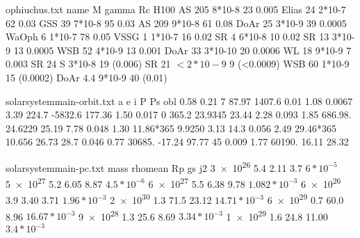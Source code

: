 \begin{filecontents}{ophiuchus.txt}
name            M    gamma      Rc      H100
  AS 205       8*10-8     23    0.005
  Elias 24     2*10-7     62    0.03
  GSS 39       7*10-8     95    0.03
  AS 209       9*10-8     61    0.08
  DoAr 25      3*10-9     39    0.0005
  WaOph 6      1*10-7     78    0.05
  VSSG 1       1*10-7     16    0.02
  SR 4         6*10-8     10    0.02
  SR 13        3*10-9     13    0.0005
  WSB 52       4*10-9     13    0.001
  DoAr 33      3*10-10    20    0.0006
  WL 18        9*10-9     7     0.003
  SR 24 S      3*10-8     19    (0.006)
  SR 21       $<2*10-9$    9     (<0.0009)
  WSB 60       1*10-9     15    (0.0002)
  DoAr 4.4     9*10-9     40    (0.01)
\end{filecontents}

\begin{filecontents}{solarsystemmain-orbit.txt}
	a  e      i    P         Ps     obl
	0.58 0.21   7    87.97     1407.6	0.01
	1.08 0.0067 3.39 224.7     -5832.6	177.36
	1.50 0.017  0    365.2     23.9345  23.44
	2.28 0.093  1.85 686.98.   24.6229  25.19
	7.78 0.048  1.30 11.86*365 9.9250   3.13
	14.3 0.056  2.49 29.46*365 10.656   26.73
	28.7 0.046  0.77 30685.    -17.24   97.77
	45   0.009  1.77 60190.    16.11    28.32
\end{filecontents}

\begin{filecontents}{solarsystemmain-pc.txt}
	mass 	  rhomean Rp   gs  j2
	\num{3e26} 5.4  2.11 3.7 $6*10^{-5}$
	\num{5e27} 5.2   6.05 8.87 $4.5*10^{-6}$
	\num{6e27} 5.5   6.38 9.78 $1.082*10^{-3}$
	\num{6e26} 3.9   3.40 3.71 $1.96*10^{-3}$
	\num{2e30} 1.3   71.5 23.12 $14.71*10^{-3}$
	\num{6e29} 0.7   60.0 8.96 $16.67*10^{-3}$
	\num{9e28} 1.3   25.6 8.69 $3.34*10^{-3}$
	\num{1e29} 1.6   24.8 11.00 $3.4*10^{-3}$
\end{filecontents}
